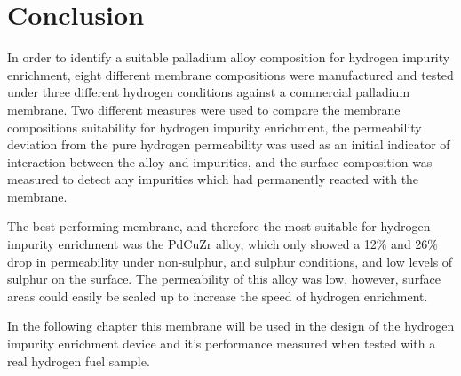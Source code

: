 \section{Conclusion}
In order to identify a suitable palladium alloy composition for hydrogen impurity enrichment, eight different membrane compositions were manufactured and tested under three different hydrogen conditions against a commercial palladium membrane. Two different measures were used to compare the membrane compositions suitability for hydrogen impurity enrichment, the permeability deviation from the pure hydrogen permeability was used as an initial indicator of interaction between the alloy and impurities, and the surface composition was measured to detect any impurities which had permanently reacted with the membrane. 

The best performing membrane, and therefore the most suitable for hydrogen impurity enrichment was the PdCuZr alloy, which only showed a 12\% and 26\% drop in permeability under non-sulphur, and sulphur conditions, and low levels of sulphur on the surface. The permeability of this alloy was low, however, surface areas could easily be scaled up to increase the speed of hydrogen enrichment. 

In the following chapter this membrane will be used in the design of the hydrogen impurity enrichment device and it's performance measured when tested with a real hydrogen fuel sample.


